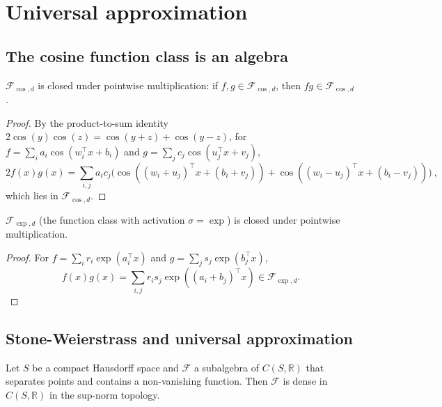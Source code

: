 \section{Universal approximation}\label{sec:universal}

\subsection{The cosine function class is an algebra}

\begin{lemma}\label{lem:cosClosedMult}
$\mathcal{F}_{\cos,d}$ is closed under pointwise multiplication: if $f, g \in \mathcal{F}_{\cos,d}$, then $fg \in \mathcal{F}_{\cos,d}$.
\end{lemma}

\begin{proof}
  By the product-to-sum identity $2\cos(y)\cos(z) = \cos(y+z) + \cos(y-z)$, for
  $f = \sum_i a_i \cos(w_i^\top x + b_i)$ and $g = \sum_j c_j \cos(u_j^\top x + v_j)$,
  \[
    2 f(x) g(x) = \sum_{i,j} a_i c_j \bigl(\cos((w_i+u_j)^\top x + (b_i+v_j)) + \cos((w_i-u_j)^\top x + (b_i-v_j))\bigr)
    \: ,
  \]
  which lies in $\mathcal{F}_{\cos,d}$.
\end{proof}

\begin{lemma}\label{lem:expClosedMult}
$\mathcal{F}_{\exp,d}$ (the function class with activation $\sigma = \exp$) is closed under pointwise multiplication.
\end{lemma}

\begin{proof}
  For $f = \sum_i r_i \exp(a_i^\top x)$ and $g = \sum_j s_j \exp(b_j^\top x)$,
  \[
    f(x)g(x) = \sum_{i,j} r_i s_j \exp((a_i + b_j)^\top x) \in \mathcal{F}_{\exp,d}.
  \]
\end{proof}

\subsection{Stone-Weierstrass and universal approximation}

\begin{theorem}\label{thm:stoneWeierstrass}
Let $S$ be a compact Hausdorff space and $\mathcal{F}$ a subalgebra of $C(S, \mathbb{R})$ that separates points and contains a non-vanishing function.
Then $\mathcal{F}$ is dense in $C(S, \mathbb{R})$ in the sup-norm topology.
\end{theorem}

